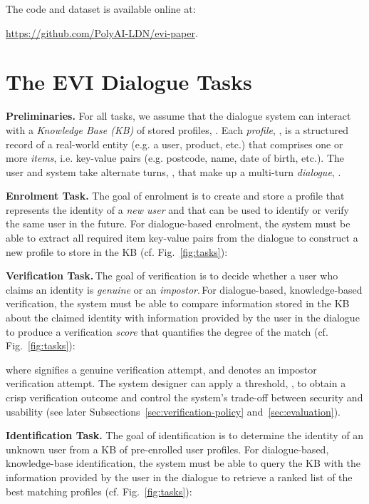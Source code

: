 \documentclass[11pt]{article}
\newcommand{\sparagraph}[1]{\noindent\textbf{#1.}}
\newcommand{\rparagraph}[1]{\vspace{1.4mm}\noindent\textbf{#1.}}
\begin{document}
The code and dataset is available online at: {\url{https://github.com/PolyAI-LDN/evi-paper}.
 
\section{The EVI Dialogue Tasks}
\label{sec:tasks}





\sparagraph{Preliminaries}
For all tasks,
we assume that the dialogue system can interact with a \textit{Knowledge Base (KB)} of stored profiles, .
Each \textit{profile}, , is a structured record
of a real-world entity (e.g. a user, product, etc.)
that comprises one or more \textit{items},
i.e. key-value pairs
(e.g. postcode, name, date of birth, etc.).
The user and system take alternate turns, , that make up a multi-turn \textit{dialogue},
.

\rparagraph{Enrolment Task}
The goal of enrolment is to
create and store a profile
that represents the identity of a \textit{new user}
and that can be used to identify or verify the same user
in the future.
For dialogue-based enrolment,
the system must be able to
extract all required item key-value pairs from the dialogue
to construct a new profile to store in the KB (cf. Fig.~\ref{fig:tasks}):

\sparagraph{Verification Task}\,The goal of verification is to
decide whether a user who claims an identity
is \textit{genuine} or an \textit{impostor}.\,For dialogue-based, knowledge-based verification,
the system must be able to
compare information stored in the KB about the claimed identity
with information provided by the user in the dialogue
to produce a verification \textit{score}
that quantifies the degree of the match
(cf. \!Fig.~\!\ref{fig:tasks}):

where  signifies a genuine verification attempt,
and  denotes an impostor verification attempt.
The system designer can apply a threshold, ,
to obtain a crisp verification outcome
and control the system's trade-off between security and usability (see later Subsections~\ref{sec:verification-policy} and~\ref{sec:evaluation}).



\rparagraph{Identification Task}
The goal of identification is to
determine the identity of an unknown user
from a KB of pre-enrolled user profiles.
For dialogue-based, knowledge-base identification,
the system must be able to query the KB with the information provided by the user in the dialogue to retrieve a ranked list of the best matching profiles
(cf. Fig.~\ref{fig:tasks}):

}
\end{document}
